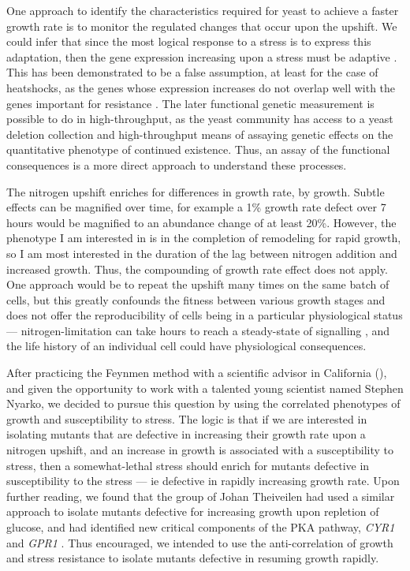 One approach to identify the characteristics required for yeast to 
achieve a faster growth rate is to monitor the regulated changes that
occur upon the upshift. We could infer
that since the most logical response to a stress is to express this
adaptation, then the gene expression increasing upon a stress must be
adaptive \parencite{gould1979spandrels}. 
This has been demonstrated to be a false assumption, at least for the
case of heatshocks, as the genes whose expression increases do not 
overlap well with the
genes important for resistance \parencite{gibney2013yeast}.
The later functional genetic measurement is possible to do in 
high-throughput, as
the yeast community has access to a yeast deletion collection and
high-throughput means of assaying genetic effects on the quantitative
phenotype of continued existence. 
Thus, an assay of the functional consequences is a more direct
approach to understand these processes.

The nitrogen upshift enriches for %
differences in growth rate, by growth. 
Subtle effects can be magnified over time, for example a
1\% growth rate defect over 7 hours would be magnified to an abundance
change of at least 20\%. However, the phenotype I am interested in is
in the completion of remodeling for rapid growth, so I am most
interested in the duration of the lag between nitrogen addition and
increased growth. Thus, the compounding of growth rate effect does not 
apply. One approach would be to repeat the upshift many times on the
same batch of cells, but this greatly confounds the fitness between 
various growth stages and does not offer the reproducibility of cells
being in a particular physiological status --- nitrogen-limitation can
take hours to reach a steady-state of signalling
\parencite{tate2013five}, and the life history of an individual cell
could have physiological consequences.

After practicing the Feynmen method with a scientific advisor in
California (), and given
the opportunity to work with a talented young scientist named Stephen
Nyarko, we decided to pursue this question by using the correlated
phenotypes of growth and susceptibility to stress.
The logic is that if we are interested in isolating mutants that are
defective in increasing their growth rate upon a nitrogen upshift, and
an increase in growth is associated with a susceptibility to stress,
then a somewhat-lethal stress should enrich for mutants defective in
susceptibility to the stress --- ie defective in rapidly increasing 
growth rate.
Upon further reading, we found that the group of Johan Theiveilen had
used a similar approach to isolate mutants defective for increasing
growth upon repletion of glucose, and had identified new critical
components of the PKA pathway, \textit{CYR1} and \textit{GPR1}
\parencite{van2000characterization}.
Thus encouraged, we intended to use the anti-correlation of growth
and stress resistance to isolate mutants defective in resuming growth
rapidly.

